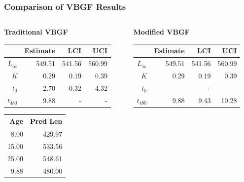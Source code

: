 \documentclass[xcolor=dvipsnames]{beamer}\usepackage[]{graphicx}\usepackage[]{color}
\begin{document}
\begin{frame}[fragile, t]
\frametitle{Comparison of VBGF Results}
\begin{columns}
\begin{column}{0.5\textwidth}
\textbf{Traditional VBGF}
\begin{table}[ht]
\centering
\begin{tabular}{rrrr}
  \hline
 & Estimate & LCI & UCI \\ 
  \hline
$L_{\infty}$ & 549.51 & 541.56 & 560.99 \\ 
  $K$ & 0.29 & 0.19 & 0.39 \\ 
  $t_{0}$ & 2.70 & -0.32 & 4.32 \\ 
  $t_{480}$ & 9.88 & - & - \\ 
   \hline
\end{tabular}
\end{table}

\smallskip
\begin{table}[ht]
\centering
\begin{tabular}{rr}
  \hline
Age & Pred Len \\ 
  \hline
8.00 & 429.97 \\ 
  15.00 & 533.56 \\ 
  25.00 & 548.61 \\ 
  9.88 & 480.00 \\ 
   \hline
\end{tabular}
\end{table}

\end{column}
\begin{column}{0.5\textwidth}
\textbf{Modified VBGF}
\begin{table}[ht]
\centering
\begin{tabular}{rrrr}
  \hline
 & Estimate & LCI & UCI \\ 
  \hline
$L_{\infty}$ & 549.51 & 541.56 & 560.99 \\ 
  $K$ & 0.29 & 0.19 & 0.39 \\ 
  $t_{0}$ & - & - & - \\ 
  $t_{480}$ & 9.88 & 9.43 & 10.28 \\ 
   \hline
\end{tabular}
\end{table}


\end{column}
\end{columns}
\end{frame}
\end{document}
